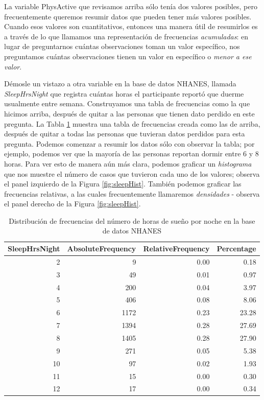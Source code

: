 \documentclass[
  12pt,
]{book}
\begin{document}
La variable PhysActive que revisamos arriba sólo tenía dos valores posibles, pero frecuentemente queremos resumir datos que pueden tener más valores posibles. Cuando esos valores son cuantitativos, entonces una manera útil de resumirlos es a través de lo que llamamos una representación de frecuencias \emph{acumuladas}: en lugar de preguntarnos cuántas observaciones toman un valor específico, nos preguntamos cuántas observaciones tienen un valor en específico o \emph{menor a ese valor}.

Démosle un vistazo a otra variable en la base de datos NHANES, llamada \emph{SleepHrsNight} que registra cuántas horas el participante reportó que duerme usualmente entre semana. Construyamos una tabla de frecuencias como la que hicimos arriba, después de quitar a las personas que tienen dato perdido en este pregunta. La Tabla \ref{tab:sleepTable} muestra una tabla de frecuencias creada como las de arriba, después de quitar a todas las personas que tuvieran datos perdidos para esta pregunta. Podemos comenzar a resumir los datos sólo con observar la tabla; por ejemplo, podemos ver que la mayoría de las personas reportan dormir entre 6 y 8 horas. Para ver esto de manera aún más clara, podemos graficar un \emph{histograma} que nos muestre el número de casos que tuvieron cada uno de los valores; observa el panel izquierdo de la Figura \ref{fig:sleepHist}. También podemos graficar las frecuencias relativas, a las cuales frecuentemente llamaremos \emph{densidades} - observa el panel derecho de la Figura \ref{fig:sleepHist}.

\begin{table}

\caption{\label{tab:sleepTable}Distribución de frecuencias del número de horas de sueño por noche en la base de datos NHANES}
\centering
\begin{tabular}[t]{r|r|r|r}
\hline
SleepHrsNight & AbsoluteFrequency & RelativeFrequency & Percentage\\
\hline
2 & 9 & 0.00 & 0.18\\
\hline
3 & 49 & 0.01 & 0.97\\
\hline
4 & 200 & 0.04 & 3.97\\
\hline
5 & 406 & 0.08 & 8.06\\
\hline
6 & 1172 & 0.23 & 23.28\\
\hline
7 & 1394 & 0.28 & 27.69\\
\hline
8 & 1405 & 0.28 & 27.90\\
\hline
9 & 271 & 0.05 & 5.38\\
\hline
10 & 97 & 0.02 & 1.93\\
\hline
11 & 15 & 0.00 & 0.30\\
\hline
12 & 17 & 0.00 & 0.34\\
\hline
\end{tabular}
\end{table}
\end{document}
